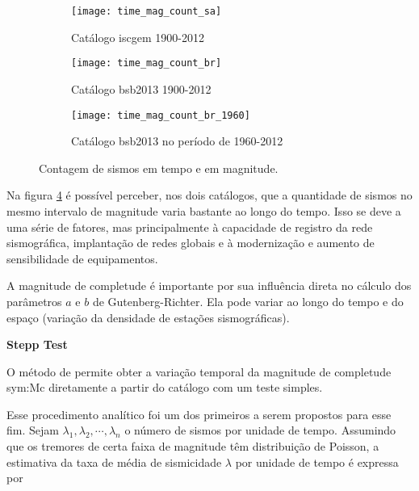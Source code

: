 \begin{figure}[H]
	  \centering
	  \begin{subfigure}[b]{0.7\textwidth}
		  	\centering
			\texttt{[image: time\_mag\_count\_sa]}
			\caption{Catálogo \gls{iscgem} 1900-2012}
			\label{fig:tmf_sa}
        \end{subfigure}%

	  \begin{subfigure}[b]{0.7\textwidth}
		  	\centering
  			\texttt{[image: time\_mag\_count\_br]}
			\caption{Catálogo \gls{bsb2013} 1900-2012}
			\label{fig:tmf_br}
       \end{subfigure}%

	   \begin{subfigure}[b]{0.7\textwidth}
		  	\centering
  			\texttt{[image: time\_mag\_count\_br\_1960]}
			\caption{Catálogo \gls{bsb2013} no período de 1960-2012}
			\label{fig:tmf_br_1960}
       \end{subfigure}%

  \caption{Contagem de sismos em tempo e em magnitude.}
  \label{fig:qc_time_mag_count} 
\end{figure}

Na figura \ref{fig:qc_time_mag_count} é possível perceber, nos dois catálogos,
que a quantidade de sismos no mesmo intervalo de magnitude varia bastante ao longo do tempo.
Isso se deve a uma série de fatores, mas principalmente à capacidade de registro
da rede sismográfica, implantação de redes globais e 
à modernização e aumento de sensibilidade de equipamentos.

A magnitude de completude é importante \citep{woessner_2005} por sua influência direta no cálculo dos parâmetros $a$ e
$b$ de Gutenberg-Richter.
Ela pode variar ao longo do tempo e do espaço (variação da densidade de estações sismográficas).


\begin{p}
\textbf{Stepp Test}
\end{p}

O método de \citet{stepp_1971} permite obter a variação temporal da magnitude
de completude \gls{sym:Mc} diretamente a partir do catálogo com um teste simples.

Esse procedimento analítico foi um dos primeiros a serem propostos para esse fim.
Sejam $\lambda_1, \lambda_2, \cdots, \lambda_n$ o número de sismos por unidade de tempo.
Assumindo que os tremores de certa faixa de magnitude têm distribuição de Poisson, a estimativa da taxa de
média de sismicidade $\lambda$ por unidade de tempo é expressa por

